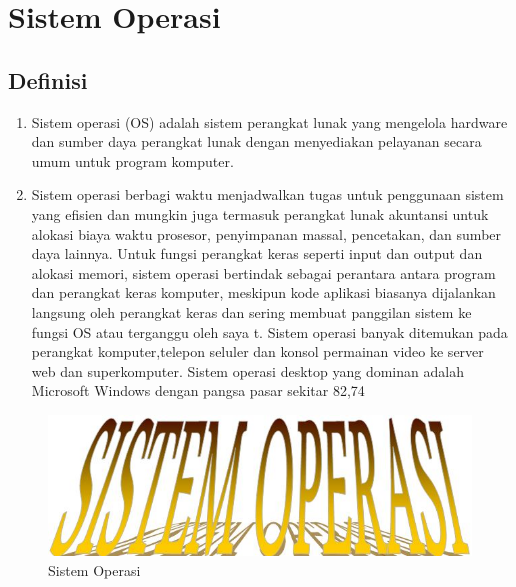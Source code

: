 \section{Sistem Operasi}
	\subsection{Definisi}
		\begin{enumerate}
			\item Sistem operasi (OS) adalah sistem perangkat lunak yang mengelola hardware dan sumber daya perangkat lunak dengan menyediakan pelayanan secara umum untuk program komputer.
			\item Sistem operasi berbagi waktu menjadwalkan tugas untuk penggunaan sistem yang efisien dan mungkin juga termasuk perangkat lunak akuntansi untuk alokasi biaya waktu prosesor, penyimpanan massal, pencetakan, dan sumber daya lainnya.
			Untuk fungsi perangkat keras seperti input dan output dan alokasi memori, sistem operasi bertindak sebagai perantara antara program dan perangkat keras komputer, meskipun kode aplikasi biasanya dijalankan langsung oleh perangkat keras dan sering membuat panggilan sistem ke fungsi OS atau terganggu oleh saya t. Sistem operasi banyak ditemukan pada perangkat komputer,telepon seluler dan konsol permainan video ke server web dan superkomputer.
			Sistem operasi desktop yang dominan adalah Microsoft Windows dengan pangsa pasar sekitar 82,74%
		\end{enumerate}
	\begin{figure}[ht]
		\centerline{\includegraphics[width=1\textwidth]{figures/OS.JPG}}
		\caption{Sistem Operasi}
		\label{OS}
	\end{figure}

